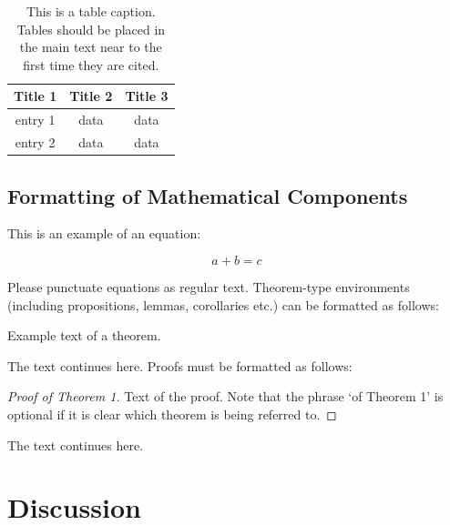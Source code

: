 \documentclass[entropy,article,submit,moreauthors,pdftex,10pt,a4paper]{Definitions/mdpi}
\begin{document}
\begin{table}[H]
\caption{This is a table caption. Tables should be placed in the main text near to the first time they are cited.}
\centering
\begin{tabular}{ccc}
\toprule
\textbf{Title 1}	& \textbf{Title 2}	& \textbf{Title 3}\\
\midrule
entry 1		& data			& data\\
entry 2		& data			& data\\
\bottomrule
\end{tabular}
\end{table}

\subsection{Formatting of Mathematical Components}

This is an example of an equation:

\begin{equation}
a + b = c
\end{equation}

Please punctuate equations as regular text. Theorem-type environments (including propositions, lemmas, corollaries etc.) can be formatted as follows:
\begin{Theorem}
Example text of a theorem.
\end{Theorem}

The text continues here. Proofs must be formatted as follows:

\begin{proof}[Proof of Theorem 1]
Text of the proof. Note that the phrase `of Theorem 1' is optional if it is clear which theorem is being referred to.
\end{proof}
The text continues here.

\section{Discussion}
\end{document}

